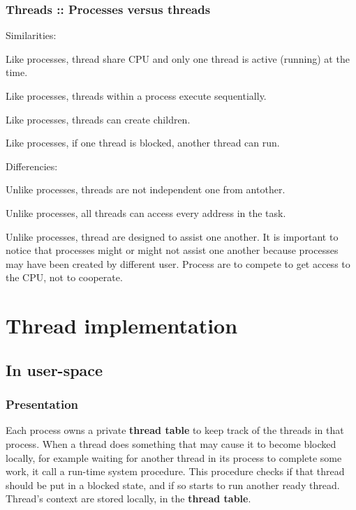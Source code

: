 \begin{frame}
  \frametitle{Threads :: Processes versus threads}

Similarities:

Like processes, thread share CPU and only one thread is active (running) at the time.

Like processes, threads within a process execute sequentially.

Like processes, threads can create children.

Like processes, if one thread is blocked, another thread can run.

Differencies:

Unlike processes, threads are not independent one from antother.

Unlike processes, all threads can access every address in the task.

Unlike processes, thread are designed to assist one another. It is important to notice that processes might or might not assist one another because processes may have been created by different user. Process are to compete to get access to the CPU, not to cooperate.

\end{frame}



%
%

\section{Thread implementation}

\subsection{In user-space}


\begin{frame}
  \frametitle{Presentation}

Each process owns a private \textbf{thread table} to keep track of the threads in that process. When a thread does something that may cause it to become blocked locally, for example waiting for another thread in its process to complete some work, it call a run-time system procedure. This procedure checks if that thread should be put in a blocked state, and if so starts to run another ready thread. Thread's context are stored locally, in the \textbf{thread table}.

\end{frame}

